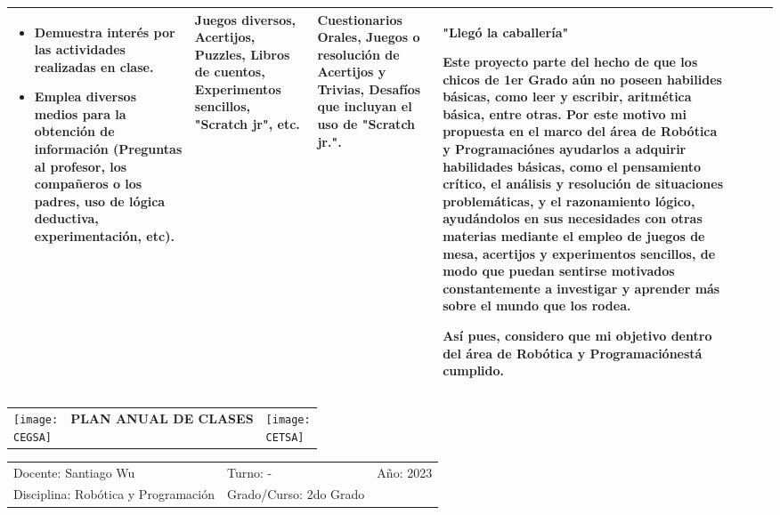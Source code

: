 \documentclass[landscape, a4paper, 10pt]{article}
\newcommand{\smallcellwidth}{0.7in}
\newcommand{\normalcellwidth}{1.2in}
\newcommand{\bigcellwidth}{2.0in}
\newcommand{\profesor}{Santiago Wu}
\newcommand{\discipline}{Robótica y Programación}
\newcommand{\currentyear}{2023}
\newcommand{\CEGSA}{cegsa-logo.png}
\newcommand{\CETSA}{cetsa-logo.png}
\begin{document}
\begin{longtable}{|m{\smallcellwidth}|p{\normalcellwidth}|p{\bigcellwidth}|p{\bigcellwidth}|p{\normalcellwidth}|p{\normalcellwidth}|p{\normalcellwidth}|}
\begin{itemize}
			\item Demuestra interés por las actividades realizadas en clase.
			\item Emplea diversos medios para la obtención de información (Preguntas al profesor, los compañeros o los padres, 
			uso de lógica deductiva, experimentación, etc).
 		\end{itemize} &
		Juegos diversos, Acertijos, Puzzles, Libros de cuentos, Experimentos sencillos, "Scratch jr", etc. &
		Cuestionarios Orales, Juegos o resolución de Acertijos y Trivias, Desafíos que incluyan el uso de "Scratch jr.". &
		"Llegó la caballería"\par
		Este proyecto parte del hecho de que los chicos de 1er Grado aún no poseen habilides básicas, como leer y escribir, aritmética básica, entre
		otras. Por este motivo mi propuesta en el marco del área de \discipline  es ayudarlos a adquirir habilidades básicas, como el 
		pensamiento crítico, el análisis y resolución de situaciones problemáticas, y el razonamiento lógico, ayudándolos en sus 
		necesidades con otras materias mediante el empleo de juegos de mesa, acertijos y experimentos sencillos, de modo que puedan 
		sentirse motivados constantemente a investigar y aprender más sobre el mundo que los rodea.\par
		Así pues, considero que mi objetivo dentro del área de \discipline  está cumplido. \\
		\hline

	\end{longtable}
	\pagebreak[4]
	\begin{tabularx}{\textwidth}{ >{\raggedright\arraybackslash}X >{\centering\arraybackslash}X >{\raggedleft\arraybackslash}X }
		\texttt{[image: \\CEGSA]} &
		\textbf{PLAN ANUAL DE CLASES} &
		\texttt{[image: \\CETSA]}
	\end{tabularx}
	\begin{tabularx}{\textwidth}{ >{\raggedright\arraybackslash}X >{\raggedright\arraybackslash}X >{\raggedright\arraybackslash}X }
		Docente: \profesor &
		Turno: - &
		Año: \currentyear \\
		Disciplina: \discipline &
		Grado/Curso: 2do Grado &
		 \\
	\end{tabularx}
\end{document}
